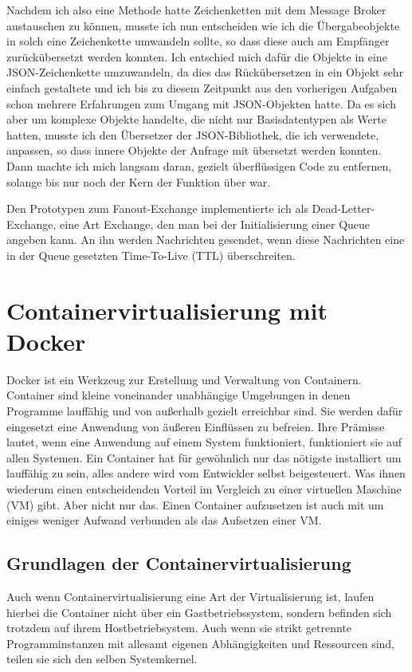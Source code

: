 \documentclass[12pt,a4paper]{scrartcl}
\begin{document}
Nachdem ich also eine Methode hatte Zeichenketten mit dem Message Broker austauschen zu können, musste ich nun entscheiden wie ich die Übergabeobjekte in solch eine Zeichenkette umwandeln sollte, so dass diese auch am Empfänger zurückübersetzt werden konnten.
Ich entschied mich dafür die Objekte in eine JSON-Zeichenkette umzuwandeln, da dies das Rückübersetzen in ein Objekt sehr einfach gestaltete und ich bis zu diesem Zeitpunkt aus den vorherigen Aufgaben schon mehrere Erfahrungen zum Umgang mit JSON-Objekten hatte. 
Da es sich aber um komplexe Objekte handelte, die nicht nur Basisdatentypen als Werte hatten, musste ich den Übersetzer der JSON-Bibliothek, die ich verwendete, anpassen, so dass innere Objekte der Anfrage mit übersetzt werden konnten. 
Dann machte ich mich langsam daran, gezielt überflüssigen Code zu entfernen, solange bis nur noch der Kern der Funktion über war.

Den Prototypen zum Fanout-Exchange implementierte ich als Dead-Letter-Exchange, eine Art Exchange, den man bei der Initialisierung einer Queue angeben kann. An ihn werden Nachrichten gesendet, wenn diese Nachrichten eine in der Queue gesetzten Time-To-Live (TTL) überschreiten.

\section{Containervirtualisierung mit Docker} \label{docker}
Docker ist ein Werkzeug zur Erstellung und Verwaltung von Containern. 
Container sind kleine voneinander unabhängige Umgebungen in denen Programme lauffähig und von außerhalb gezielt erreichbar sind. Sie werden dafür eingesetzt eine Anwendung von äußeren Einflüssen zu befreien. Ihre Prämisse lautet, wenn eine Anwendung auf einem System funktioniert, funktioniert sie auf allen Systemen. Ein Container hat für gewöhnlich nur das nötigste installiert um lauffähig zu sein, alles andere wird vom Entwickler selbst beigesteuert. Was ihnen wiederum einen entscheidenden Vorteil im Vergleich zu einer virtuellen Maschine (VM) gibt. Aber nicht nur das. Einen Container aufzusetzen ist auch mit um einiges weniger Aufwand verbunden als das Aufsetzen einer VM. 

\subsection{Grundlagen der Containervirtualisierung}

Auch wenn Containervirtualisierung eine Art der Virtualisierung ist, laufen hierbei die Container nicht über ein Gastbetriebssystem, sondern befinden sich trotzdem auf ihrem Hostbetriebsystem. Auch wenn sie strikt getrennte Programminstanzen mit allesamt eigenen Abhängigkeiten und Ressourcen sind, teilen sie sich den selben Systemkernel. 
\end{document}

